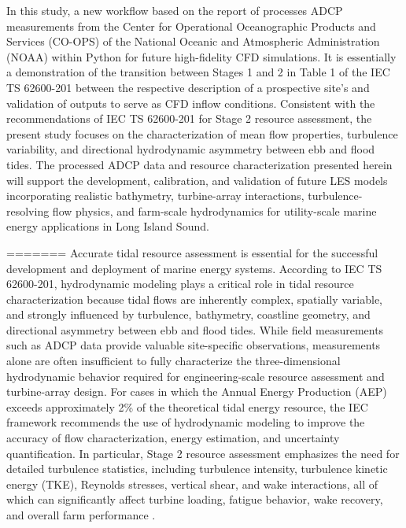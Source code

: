 \documentclass[12pt,sort&compress]{elsarticle}
\theoremstyle{definition}%
\begin{document}

In this study, a new workflow based on the report of \citet{husoVP2026} processes ADCP measurements from the Center for Operational Oceanographic Products and Services (CO-OPS) of the National Oceanic and Atmospheric Administration (NOAA) within Python for future high-fidelity CFD simulations. It is essentially a demonstration of the transition between Stages 1 and 2 in Table 1 of the IEC TS 62600-201 between the respective description of a prospective site's and validation of outputs to serve as CFD inflow conditions. Consistent with the recommendations of IEC TS 62600-201 \cite{noauthor_iec_nodate} for Stage 2 resource assessment, the present study focuses on the characterization of mean flow properties, turbulence variability, and directional hydrodynamic asymmetry between ebb and flood tides. The processed ADCP data and resource characterization presented herein will support the development, calibration, and validation of future LES models incorporating realistic bathymetry, turbine-array interactions, turbulence-resolving flow physics, and farm-scale hydrodynamics for utility-scale marine energy applications in Long Island Sound.

=======
\iffalse
Accurate tidal resource assessment is essential for the successful development and deployment of marine energy systems. According to IEC TS 62600-201, hydrodynamic modeling plays a critical role in tidal resource characterization because tidal flows are inherently complex, spatially variable, and strongly influenced by turbulence, bathymetry, coastline geometry, and directional asymmetry between ebb and flood tides. While field measurements such as ADCP data provide valuable site-specific observations, measurements alone are often insufficient to fully characterize the three-dimensional hydrodynamic behavior required for engineering-scale resource assessment and turbine-array design. For cases in which the Annual Energy Production (AEP) exceeds approximately 2\% of the theoretical tidal energy resource, the IEC framework recommends the use of hydrodynamic modeling to improve the accuracy of flow characterization, energy estimation, and uncertainty quantification. In particular, Stage 2 resource assessment emphasizes the need for detailed turbulence statistics, including turbulence intensity, turbulence kinetic energy (TKE), Reynolds stresses, vertical shear, and wake interactions, all of which can significantly affect turbine loading, fatigue behavior, wake recovery, and overall farm performance \cite{noauthor_iec_nodate}.
\end{document}
